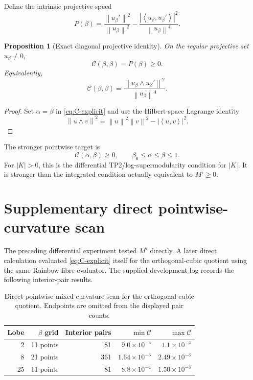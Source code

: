 \documentclass[11pt]{amsart}
\numberwithin{equation}{section}
\theoremstyle{plain}
\newtheorem{proposition}[theorem]{Proposition}
\theoremstyle{definition}
\theoremstyle{remark}
\newcommand{\Ccal}{\mathcal C}
\newcommand{\ip}[2]{\left\langle #1,#2\right\rangle}
\newcommand{\norm}[1]{\left\lVert #1\right\rVert}
\begin{document}
Define the intrinsic projective speed
\begin{equation}
P(\beta)
=\frac{\norm{u_\beta'}^2}{\norm{u_\beta}^2}
-\frac{|\ip{u_\beta}{u_\beta'}|^2}{\norm{u_\beta}^4}.
\label{eq:P}
\end{equation}

\begin{proposition}[Exact diagonal projective identity]
\label{prop:diagonal}
On the regular projective set $u_\beta\ne0$,
\begin{equation}
\boxed{\Ccal(\beta,\beta)=P(\beta)\ge0.}
\label{eq:Cdiag}
\end{equation}
Equivalently,
\begin{equation}
\boxed{
\Ccal(\beta,\beta)
=\frac{\norm{u_\beta\wedge u_\beta'}^2}{\norm{u_\beta}^4}.
}
\label{eq:Cdiag-wedge}
\end{equation}
\end{proposition}

\begin{proof}
Set $\alpha=\beta$ in \eqref{eq:C-explicit} and use the Hilbert-space Lagrange identity
\begin{equation}
\norm{u\wedge v}^2=\norm{u}^2\norm{v}^2-|\ip{u}{v}|^2.
\end{equation}
\end{proof}

The stronger pointwise target is
\begin{equation}
\boxed{
\Ccal(\alpha,\beta)\ge0,
\qquad \beta_0\le\alpha\le\beta\le1.
}
\label{eq:TP2-target}
\end{equation}
For $|K|>0$, this is the differential TP2/log-supermodularity condition for $|K|$.  It is stronger than the integrated condition actually equivalent to $M'\ge0$.

\section{Supplementary direct pointwise-curvature scan}
\label{sec:Cscan}

The preceding differential experiment tested $M'$ directly.  A later direct calculation evaluated \eqref{eq:C-explicit} itself for the orthogonal-cubic quotient using the same Rainbow fibre evaluator.  The supplied development log records the following interior-pair results.

\begin{table}[t]
\centering
\caption{Direct pointwise mixed-curvature scan for the orthogonal-cubic quotient.  Endpoints are omitted from the displayed pair counts.}
\label{tab:Cscan}
\begin{tabular}{rrrrr}
\toprule
Lobe & $\beta$ grid & Interior pairs & $\min\Ccal$ & $\max\Ccal$\\
\midrule
2  & 11 points & 81  & $9.0\times10^{-5}$ & $1.1\times10^{-4}$\\
8  & 21 points & 361 & $1.64\times10^{-3}$ & $2.49\times10^{-3}$\\
25 & 11 points & 81  & $8.8\times10^{-4}$ & $1.50\times10^{-3}$\\
\bottomrule
\end{tabular}
\end{table}
\end{document}
